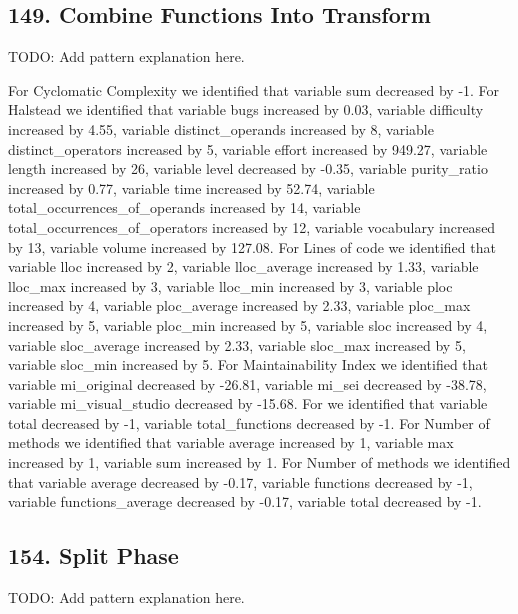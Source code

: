 \subsection{149. Combine Functions Into Transform}

TODO: Add pattern explanation here.

For Cyclomatic Complexity we identified that variable sum decreased by -1.
For Halstead we identified that variable bugs increased by 0.03, variable difficulty increased by 4.55, variable distinct\_operands increased by 8, variable distinct\_operators increased by 5, variable effort increased by 949.27, variable length increased by 26, variable level decreased by -0.35, variable purity\_ratio increased by 0.77, variable time increased by 52.74, variable total\_occurrences\_of\_operands increased by 14, variable total\_occurrences\_of\_operators increased by 12, variable vocabulary increased by 13, variable volume increased by 127.08.
For Lines of code we identified that variable lloc increased by 2, variable lloc\_average increased by 1.33, variable lloc\_max increased by 3, variable lloc\_min increased by 3, variable ploc increased by 4, variable ploc\_average increased by 2.33, variable ploc\_max increased by 5, variable ploc\_min increased by 5, variable sloc increased by 4, variable sloc\_average increased by 2.33, variable sloc\_max increased by 5, variable sloc\_min increased by 5.
For Maintainability Index we identified that variable mi\_original decreased by -26.81, variable mi\_sei decreased by -38.78, variable mi\_visual\_studio decreased by -15.68.
For  we identified that variable total decreased by -1, variable total\_functions decreased by -1.
For Number of methods we identified that variable average increased by 1, variable max increased by 1, variable sum increased by 1.
For Number of methods we identified that variable average decreased by -0.17, variable functions decreased by -1, variable functions\_average decreased by -0.17, variable total decreased by -1.

\subsection{154. Split Phase}

TODO: Add pattern explanation here.

